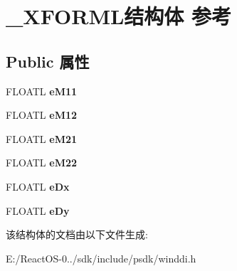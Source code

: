 \hypertarget{struct___x_f_o_r_m_l}{}\section{\+\_\+\+X\+F\+O\+R\+M\+L结构体 参考}
\label{struct___x_f_o_r_m_l}
\subsection*{Public 属性}
\begin{DoxyCompactItemize}
\item 
\mbox{\label{struct___x_f_o_r_m_l_a71391791578443f390ead040a45ccdaf}} 
F\+L\+O\+A\+TL {\bfseries e\+M11}
\item 
\mbox{\label{struct___x_f_o_r_m_l_a640d0ecd81ceb655e68f429e3e680275}} 
F\+L\+O\+A\+TL {\bfseries e\+M12}
\item 
\mbox{\label{struct___x_f_o_r_m_l_aec40871267c6a8772ff50258a2a8c352}} 
F\+L\+O\+A\+TL {\bfseries e\+M21}
\item 
\mbox{\label{struct___x_f_o_r_m_l_a76951727af65ebe0a8078d8a8e1f8c8a}} 
F\+L\+O\+A\+TL {\bfseries e\+M22}
\item 
\mbox{\label{struct___x_f_o_r_m_l_a5cb6b578137357df6e8d7152896bbc10}} 
F\+L\+O\+A\+TL {\bfseries e\+Dx}
\item 
\mbox{\label{struct___x_f_o_r_m_l_a959004be8c7b1c5e4106670537fce77f}} 
F\+L\+O\+A\+TL {\bfseries e\+Dy}
\end{DoxyCompactItemize}


该结构体的文档由以下文件生成\+:\begin{DoxyCompactItemize}
\item 
E\+:/\+React\+O\+S-\/0../sdk/include/psdk/winddi.\+h\end{DoxyCompactItemize}
